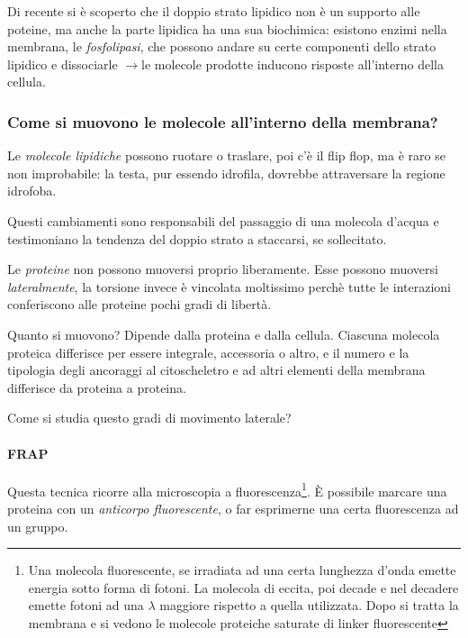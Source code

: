 \documentclass[a4paper,12pt]{article}
\newcommand{\lfreccia}{\ensuremath{\longrightarrow}}
\begin{document}
Di recente si è scoperto che il doppio strato lipidico non è un supporto alle poteine, ma anche la parte lipidica ha una sua biochimica: esistono enzimi nella membrana, le \emph{fosfolipasi}, che possono andare su certe componenti dello strato lipidico e dissociarle \lfreccia le molecole prodotte inducono risposte all'interno della cellula.


\subsubsection{Come si muovono le molecole all'interno della membrana?}

Le \emph{molecole lipidiche} possono ruotare o traslare, poi c'è il flip flop, ma è raro se non improbabile: la testa, pur essendo idrofila, dovrebbe attraversare la regione idrofoba. 

Questi cambiamenti sono responsabili del passaggio di una molecola d'acqua e testimoniano la tendenza del doppio strato a staccarsi, se sollecitato.


Le \emph{proteine} non possono muoversi proprio liberamente. Esse possono muoversi \emph{lateralmente}, la torsione invece è vincolata moltissimo perchè tutte le interazioni conferiscono alle proteine pochi gradi di libertà.

Quanto si muovono? Dipende dalla proteina e dalla cellula. Ciascuna molecola proteica differisce per essere integrale, accessoria o altro, e il numero e la tipologia degli ancoraggi al citoscheletro e ad altri elementi della membrana differisce da proteina a proteina. 

Come si studia questo gradi di movimento laterale?
\paragraph{FRAP}

Questa tecnica ricorre alla microscopia a fluorescenza\footnote{Una molecola fluorescente, se irradiata ad una certa lunghezza d'onda emette energia sotto forma di fotoni. La molecola di eccita, poi decade e nel decadere emette fotoni ad una $\lambda$ maggiore rispetto a quella utilizzata. Dopo si tratta la membrana e si vedono le molecole proteiche saturate di linker fluorescente}. È possibile marcare una proteina con un \emph{anticorpo fluorescente}, o far esprimerne una certa fluorescenza ad un gruppo.
\end{document}
